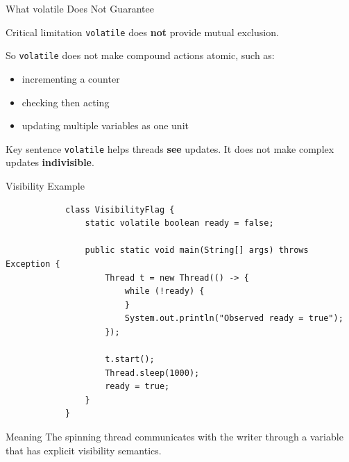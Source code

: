 \documentclass[aspectratio=169,11pt]{beamer}
\begin{document}
	\begin{frame}{What volatile Does Not Guarantee}
		\begin{alertblock}{Critical limitation}
			\texttt{volatile} does \textbf{not} provide mutual exclusion.
		\end{alertblock}
		
		\vspace{0.3cm}
		
		So \texttt{volatile} does not make compound actions atomic, such as:
		
		\begin{itemize}
			\item incrementing a counter
			\item checking then acting
			\item updating multiple variables as one unit
		\end{itemize}
		
		\vspace{0.3cm}
		
		\begin{exampleblock}{Key sentence}
			\texttt{volatile} helps threads \textbf{see} updates.  
			It does not make complex updates \textbf{indivisible}.
		\end{exampleblock}
	\end{frame}
	
	\begin{frame}[fragile]{Visibility Example}
		\begin{lstlisting}
			class VisibilityFlag {
				static volatile boolean ready = false;
				
				public static void main(String[] args) throws Exception {
					Thread t = new Thread(() -> {
						while (!ready) {
						}
						System.out.println("Observed ready = true");
					});
					
					t.start();
					Thread.sleep(1000);
					ready = true;
				}
			}
		\end{lstlisting}
		
		\vspace{0.2cm}
		
		\begin{block}{Meaning}
			The spinning thread communicates with the writer through a variable that has explicit visibility semantics.
		\end{block}
	\end{frame}
	
\end{document}
